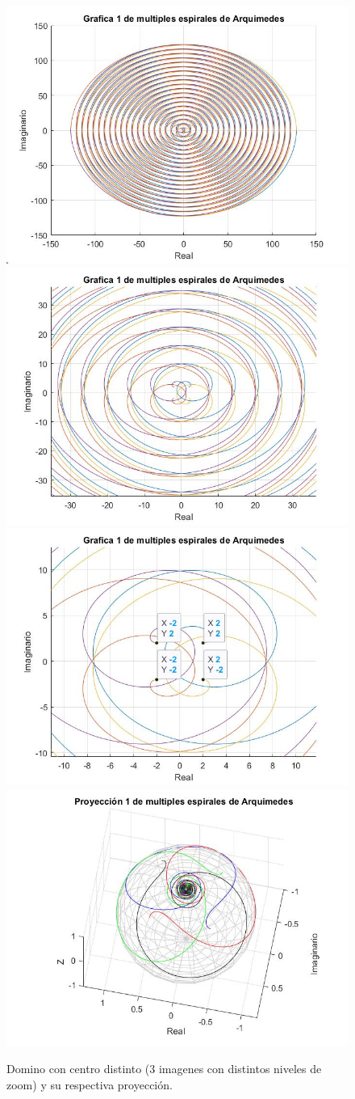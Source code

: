 \documentclass[a4paper,12pt]{article}
\begin{document}
    \begin{figure}[H]
        \centering
        \includegraphics[width=0.49\linewidth]{grafica1EspiralesArquimedes_no_zoom.jpg}\\
        \includegraphics[width=0.49\linewidth]{grafica1EspiralesArquimedes_zoom_med.jpg}
        \includegraphics[width=0.49\linewidth]{grafica1EspiralesArquimedes_zoom.jpg}
        \includegraphics[width=0.49\linewidth]{grafica1EspiralesArquimedes_proyect1.jpg}
        \caption{Domino con centro distinto (3 imagenes con distintos niveles de zoom) y su respectiva proyección.}
    \end{figure}
    
\end{document}
